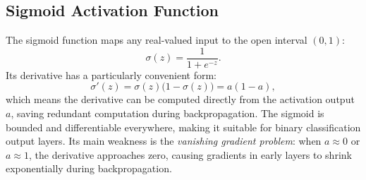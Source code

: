 \documentclass[runningheads]{llncs}
\begin{document}
\subsection{Sigmoid Activation Function}

The sigmoid function maps any real-valued input to the open interval $(0, 1)$:
\begin{equation}
  \sigma(z) = \frac{1}{1 + e^{-z}}.
\end{equation}
Its derivative has a particularly convenient form:
\begin{equation}
  \sigma'(z) = \sigma(z)\bigl(1 - \sigma(z)\bigr) = a(1-a),
\end{equation}
which means the derivative can be computed directly from the activation output
$a$, saving redundant computation during backpropagation. The sigmoid is
bounded and differentiable everywhere, making it suitable for binary
classification output layers. Its main weakness is the \emph{vanishing gradient
problem}: when $a \approx 0$ or $a \approx 1$, the derivative approaches zero,
causing gradients in early layers to shrink exponentially during backpropagation.
\end{document}

